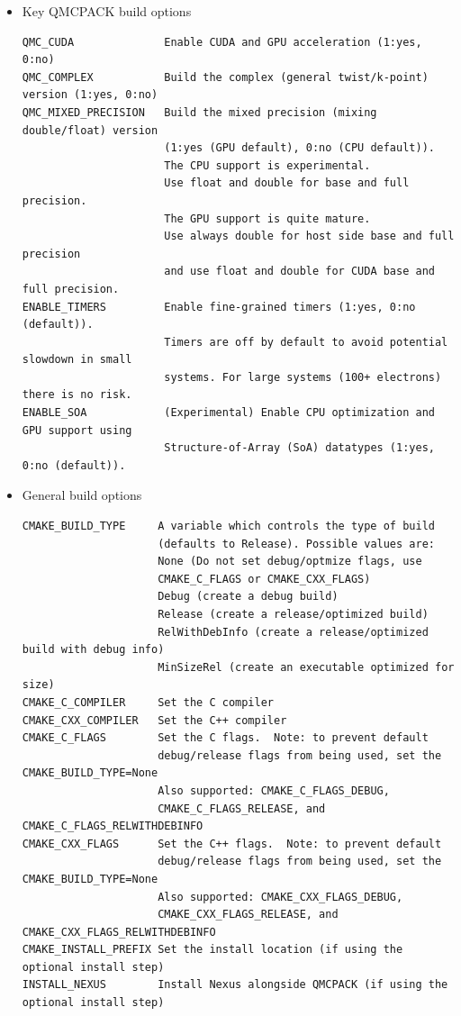 \begin{itemize}
\item  Key QMCPACK build options
\verbatimfont{\footnotesize}%
\begin{verbatim}
QMC_CUDA              Enable CUDA and GPU acceleration (1:yes, 0:no)
QMC_COMPLEX           Build the complex (general twist/k-point) version (1:yes, 0:no)
QMC_MIXED_PRECISION   Build the mixed precision (mixing double/float) version
                      (1:yes (GPU default), 0:no (CPU default)).
                      The CPU support is experimental.
                      Use float and double for base and full precision.
                      The GPU support is quite mature.
                      Use always double for host side base and full precision
                      and use float and double for CUDA base and full precision.
ENABLE_TIMERS         Enable fine-grained timers (1:yes, 0:no (default)).
                      Timers are off by default to avoid potential slowdown in small
                      systems. For large systems (100+ electrons) there is no risk.
ENABLE_SOA            (Experimental) Enable CPU optimization and GPU support using
                      Structure-of-Array (SoA) datatypes (1:yes, 0:no (default)).
\end{verbatim}

\item General build options
\verbatimfont{\footnotesize}%
\begin{verbatim}
CMAKE_BUILD_TYPE     A variable which controls the type of build
                     (defaults to Release). Possible values are:
                     None (Do not set debug/optmize flags, use
                     CMAKE_C_FLAGS or CMAKE_CXX_FLAGS)
                     Debug (create a debug build)
                     Release (create a release/optimized build)
                     RelWithDebInfo (create a release/optimized build with debug info)
                     MinSizeRel (create an executable optimized for size)
CMAKE_C_COMPILER     Set the C compiler
CMAKE_CXX_COMPILER   Set the C++ compiler
CMAKE_C_FLAGS        Set the C flags.  Note: to prevent default
                     debug/release flags from being used, set the CMAKE_BUILD_TYPE=None
                     Also supported: CMAKE_C_FLAGS_DEBUG,
                     CMAKE_C_FLAGS_RELEASE, and CMAKE_C_FLAGS_RELWITHDEBINFO
CMAKE_CXX_FLAGS      Set the C++ flags.  Note: to prevent default
                     debug/release flags from being used, set the CMAKE_BUILD_TYPE=None
                     Also supported: CMAKE_CXX_FLAGS_DEBUG,
                     CMAKE_CXX_FLAGS_RELEASE, and CMAKE_CXX_FLAGS_RELWITHDEBINFO
CMAKE_INSTALL_PREFIX Set the install location (if using the optional install step)
INSTALL_NEXUS        Install Nexus alongside QMCPACK (if using the optional install step)
\end{verbatim}


\end{itemize}
